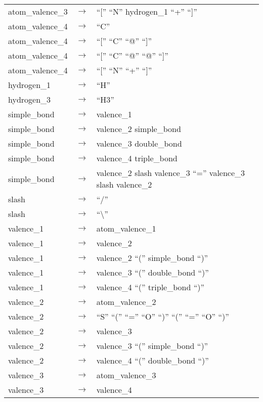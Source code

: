 \begin{longtable}{m{} p{} p{}}
    atom\_valence\_3 & $\rightarrow$ & ``['' ``N'' hydrogen\_1 ``+'' ``]'' \\
    atom\_valence\_4 & $\rightarrow$ & ``C'' \\
    atom\_valence\_4 & $\rightarrow$ & ``['' ``C'' ``@'' ``]'' \\
    atom\_valence\_4 & $\rightarrow$ & ``['' ``C'' ``@'' ``@'' ``]'' \\
    atom\_valence\_4 & $\rightarrow$ & ``['' ``N'' ``+'' ``]'' \\
    hydrogen\_1 & $\rightarrow$ & ``H'' \\
    hydrogen\_3 & $\rightarrow$ & ``H3'' \\
    simple\_bond & $\rightarrow$ & valence\_1 \\
    simple\_bond & $\rightarrow$ & valence\_2 simple\_bond \\
    simple\_bond & $\rightarrow$ & valence\_3 double\_bond \\
    simple\_bond & $\rightarrow$ & valence\_4 triple\_bond \\
    simple\_bond & $\rightarrow$ & valence\_2 slash valence\_3 ``='' valence\_3 slash valence\_2 \\
    slash & $\rightarrow$ & ``/'' \\
    slash & $\rightarrow$ & ``\textbackslash'' \\
    valence\_1 & $\rightarrow$ & atom\_valence\_1 \\
    valence\_1 & $\rightarrow$ & valence\_2 \\
    valence\_1 & $\rightarrow$ & valence\_2 ``('' simple\_bond ``)'' \\
    valence\_1 & $\rightarrow$ & valence\_3 ``('' double\_bond ``)'' \\
    valence\_1 & $\rightarrow$ & valence\_4 ``('' triple\_bond ``)'' \\
    valence\_2 & $\rightarrow$ & atom\_valence\_2 \\
    valence\_2 & $\rightarrow$ & ``S'' ``('' ``='' ``O'' ``)'' ``('' ``='' ``O'' ``)'' \\
    valence\_2 & $\rightarrow$ & valence\_3 \\
    valence\_2 & $\rightarrow$ & valence\_3 ``('' simple\_bond ``)'' \\
    valence\_2 & $\rightarrow$ & valence\_4 ``('' double\_bond ``)'' \\
    valence\_3 & $\rightarrow$ & atom\_valence\_3 \\
    valence\_3 & $\rightarrow$ & valence\_4 \\

\end{longtable}
